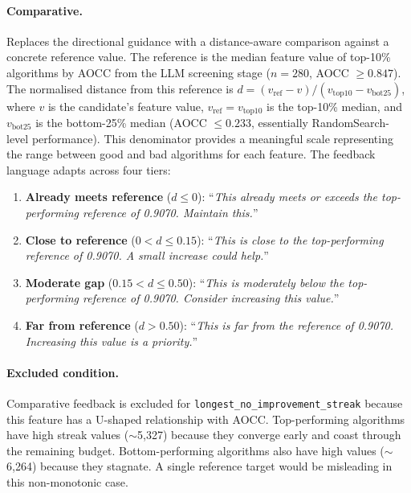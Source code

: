 \paragraph{Comparative.}
Replaces the directional guidance with a distance-aware comparison against a concrete reference value. The reference is the median feature value of top-10\% algorithms by AOCC from the LLM screening stage ($n = 280$, AOCC $\geq 0.847$). The normalised distance from this reference is $d = (v_{\text{ref}} - v) / (v_{\text{top10}} - v_{\text{bot25}})$, where $v$ is the candidate's feature value, $v_{\text{ref}} = v_{\text{top10}}$ is the top-10\% median, and $v_{\text{bot25}}$ is the bottom-25\% median (AOCC $\leq 0.233$, essentially RandomSearch-level performance). This denominator provides a meaningful scale representing the range between good and bad algorithms for each feature. The feedback language adapts across four tiers:

\begin{enumerate}
  \item \textbf{Already meets reference} ($d \leq 0$): ``\textit{This already meets or exceeds the top-performing reference of 0.9070. Maintain this.}''
  \item \textbf{Close to reference} ($0 < d \leq 0.15$): ``\textit{This is close to the top-performing reference of 0.9070. A small increase could help.}''
  \item \textbf{Moderate gap} ($0.15 < d \leq 0.50$): ``\textit{This is moderately below the top-performing reference of 0.9070. Consider increasing this value.}''
  \item \textbf{Far from reference} ($d > 0.50$): ``\textit{This is far from the reference of 0.9070. Increasing this value is a priority.}''
\end{enumerate}

\paragraph{Excluded condition.}
Comparative feedback is excluded for \texttt{longest\_no\_improvement\_streak} because this feature has a U-shaped relationship with AOCC. Top-performing algorithms have high streak values ($\sim$5{,}327) because they converge early and coast through the remaining budget. Bottom-performing algorithms also have high values ($\sim$6{,}264) because they stagnate. A single reference target would be misleading in this non-monotonic case.

